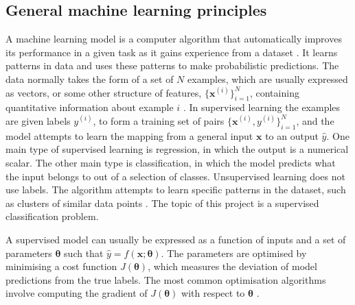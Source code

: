 \documentclass[12pt]{article}
\begin{document}
\subsection{General machine learning principles}
A machine learning model is a computer algorithm that automatically improves its performance in a given task as it gains experience from a dataset \cite{Goodfellow16}. It learns patterns in data and uses these patterns to make probabilistic predictions. The data normally takes the form of a set of $N$ examples, which are usually expressed as vectors, or some other structure of features, $\{\bm{x}^{(i)}\}_{i=1}^N$, containing quantitative information about example $i$ \cite{Murphy12}. In supervised learning the examples are given labels $y^{(i)}$, to form a training set of pairs $\{\bm{x}^{(i)}, y^{(i)}\}_{i=1}^N$, and the model attempts to learn the mapping from a general input $\bm{x}$ to an output $\hat{y}$. One main type of supervised learning is regression, in which the output is a numerical scalar. The other main type is classification, in which the model predicts what the input belongs to out of a selection of classes. Unsupervised learning does not use labels. The algorithm attempts to learn specific patterns in the dataset, such as clusters of similar data points \cite{Murphy12}. The topic of this project is a supervised classification problem.

A supervised model can usually be expressed as a function of inputs and a set of parameters $\bm\theta$ such that $\hat{y}=f(\bm{x};\bm\theta)$. The parameters are optimised by minimising a cost function $J(\bm\theta)$, which measures the deviation of model predictions from the true labels. The most common optimisation algorithms involve computing the gradient of $J(\bm\theta)$ with respect to $\bm\theta$ \cite{Goodfellow16}. 
\end{document}
